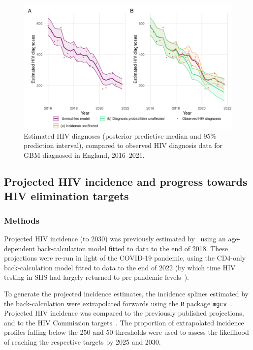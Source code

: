 \begin{figure}[htbp!]
  \centering
  \includegraphics[width=\textwidth]{counterfactual_fit.pdf}
  \caption[Estimated HIV diagnoses (posterior predictive median and 95\% prediction interval), compared to observed HIV diagnosis data for GBM diagnosed in England, 2016--2021]{Estimated HIV diagnoses (posterior predictive median and 95\% prediction interval), compared to observed HIV diagnosis data for GBM diagnosed in England, 2016--2021.}\label{fig:counterfactual_fit}
\end{figure}



\subsection{Projected HIV incidence and progress towards HIV elimination targets}

\subsubsection{Methods}

Projected HIV incidence (to 2030) was previously estimated by~\cite{Brizzi2021-zl} using an age-dependent back-calculation model fitted to data to the end of 2018. These projections were re-run in light of the COVID-19 pandemic, using the CD4-only back-calculation model fitted to data to the end of 2022 (by which time HIV testing in SHS had largely returned to pre-pandemic levels~\parencite{Martin2023-um}).

To generate the projected incidence estimates, the incidence splines estimated by the back-calculation were extrapolated forwards using the \texttt{R} package \texttt{mgcv}~\parencite{Wood2016-ph}. Projected HIV incidence was compared to the previously published projections, and to the HIV Commission targets~\parencite{HIV_Commission2020-yy}. The proportion of extrapolated incidence profiles falling below the 250 and 50 thresholds were used to assess the likelihood of reaching the respective targets by 2025 and 2030.

